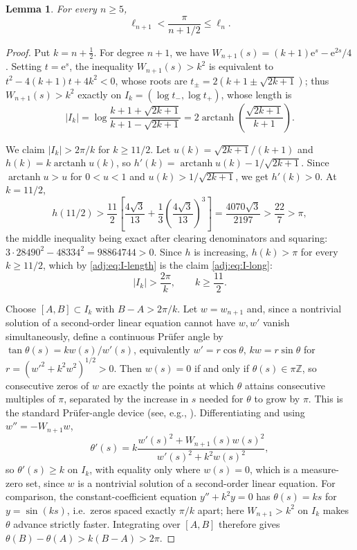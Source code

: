 \documentclass[11pt]{article}
\numberwithin{equation}{section}
\newtheorem{lemma}[theorem]{Lemma}
\theoremstyle{definition}
\theoremstyle{remark}
\newcommand{\e}{\mathrm e}
\begin{document}
\begin{lemma}\label{adj:lem:large-comparison}
For every $n\geq5$,
\begin{equation}\label{adj:eq:strict-large}
 \ell_{n+1}<\frac{\pi}{n+1/2}\leq\ell_n.
\end{equation}
\end{lemma}

\begin{proof}
Put $k=n+\frac12$. For degree $n+1$, we have $W_{n+1}(s)=(k+1)\e^s-\e^{2s}/4$. Setting $t=\e^s$, the inequality $W_{n+1}(s)>k^2$ is equivalent to $t^2-4(k+1)t+4k^2<0$, whose roots are $t_\pm=2(k+1\pm\sqrt{2k+1})$; thus $W_{n+1}(s)>k^2$ exactly on $I_k=(\log t_-,\log t_+)$, whose length is
\begin{equation}\label{adj:eq:I-length}
 |I_k|=\log\frac{k+1+\sqrt{2k+1}}{k+1-\sqrt{2k+1}}=2\operatorname{arctanh}\left(\frac{\sqrt{2k+1}}{k+1}\right).
\end{equation}

We claim $|I_k|>2\pi/k$ for $k\geq11/2$. Let $u(k)=\sqrt{2k+1}/(k+1)$ and $h(k)=k\operatorname{arctanh}u(k)$, so $h'(k)=\operatorname{arctanh}u(k)-1/\sqrt{2k+1}$. Since $\operatorname{arctanh}u>u$ for $0<u<1$ and $u(k)>1/\sqrt{2k+1}$, we get $h'(k)>0$. At $k=11/2$,
\[
 h(11/2)>\frac{11}{2}\left[\frac{4\sqrt3}{13}+\frac13\left(\frac{4\sqrt3}{13}\right)^3\right]=\frac{4070\sqrt3}{2197}>\frac{22}{7}>\pi,
\]
the middle inequality being exact after clearing denominators and squaring: $3\cdot28490^2-48334^2=98864744>0$. Since $h$ is increasing, $h(k)>\pi$ for every $k\geq11/2$, which by \eqref{adj:eq:I-length} is the claim \eqref{adj:eq:I-long}:
\begin{equation}\label{adj:eq:I-long}
 |I_k|>\frac{2\pi}{k},
 \qquad k\geq\frac{11}{2}.
\end{equation}

Choose $[A,B]\subset I_k$ with $B-A>2\pi/k$. Let $w=w_{n+1}$ and, since a nontrivial solution of a second-order linear equation cannot have $w,w'$ vanish simultaneously, define a continuous Pr\"ufer angle by $\tan\theta(s)=kw(s)/w'(s)$, equivalently $w'=r\cos\theta$, $kw=r\sin\theta$ for $r=(w'^2+k^2w^2)^{1/2}>0$. Then $w(s)=0$ if and only if $\theta(s)\in\pi\mathbb Z$, so consecutive
zeros of $w$ are exactly the points at which $\theta$ attains consecutive
multiples of $\pi$, separated by the increase in $s$ needed for $\theta$ to
grow by $\pi$. This is the standard Pr\"ufer-angle device (see, e.g.,
\cite{teschl2012}). Differentiating and using $w''=-W_{n+1}w$,
\begin{equation*}
 \theta'(s)=k\frac{w'(s)^2+W_{n+1}(s)w(s)^2}{w'(s)^2+k^2w(s)^2},
\end{equation*}
so $\theta'(s)\geq k$ on $I_k$, with equality only where $w(s)=0$, which is a measure-zero set, since $w$ is a nontrivial solution of a second-order linear equation. For comparison, the constant-coefficient equation $y''+k^2y=0$ has $\theta(s)=ks$ for $y=\sin(ks)$, i.e.\ zeros spaced exactly $\pi/k$ apart; here $W_{n+1}>k^2$ on $I_k$ makes $\theta$ advance strictly faster. Integrating over $[A,B]$ therefore gives $\theta(B)-\theta(A)>k(B-A)>2\pi$.


\end{proof}
\end{document}
